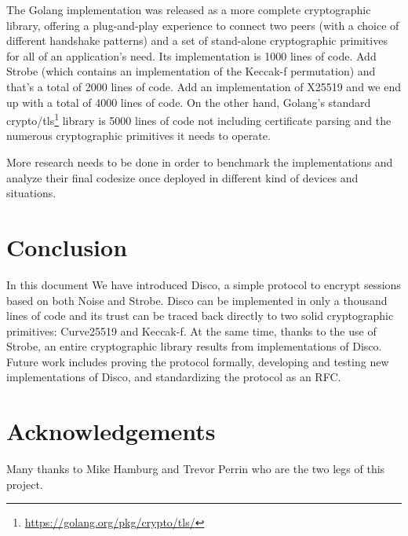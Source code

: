 \documentclass{article}
\begin{document}
The Golang implementation was released as a more complete cryptographic library, offering a plug-and-play experience to connect two peers (with a choice of different handshake patterns) and a set of stand-alone cryptographic primitives for all of an application's need. Its implementation is 1000 lines of code. Add  Strobe (which contains an implementation of the Keccak-f permutation) and that's a total of 2000 lines of code. Add an implementation of X25519 and we end up with a total of 4000 lines of code. On the other hand, Golang's standard crypto/tls\footnote{\url{https://golang.org/pkg/crypto/tls/}} library is 5000 lines of code not including certificate parsing and the numerous cryptographic primitives it needs to operate.

More research needs to be done in order to benchmark the implementations and analyze their final codesize once deployed in different kind of devices and situations.

\section{Conclusion}

In this document We have introduced Disco, a simple protocol to encrypt sessions based on both Noise and Strobe. Disco can be implemented in only a thousand lines of code and its trust can be traced back directly to two solid cryptographic primitives: Curve25519 and Keccak-f. At the same time, thanks to the use of Strobe, an entire cryptographic library results from implementations of Disco. Future work includes proving the protocol formally, developing and testing new implementations of Disco, and standardizing the protocol as an RFC.

\section*{Acknowledgements}

Many thanks to Mike Hamburg and Trevor Perrin who are the two legs of this project.
\newpage
\printbibliography
\end{document}
